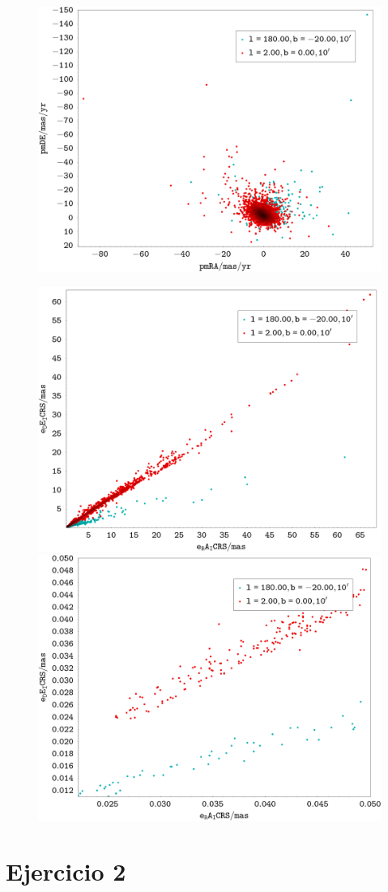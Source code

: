 \documentclass[a4paper,fleqn,usenatbib]{mnras}
\begin{document}
\begin{figure}
  \includegraphics[width=\linewidth]{img/ejercicio1_pmra_pmde}
\end{figure}

\begin{figure}
  \includegraphics[width=0.49\linewidth]{img/ejercicio1_era_ede}
  \includegraphics[width=0.49\linewidth]{img/ejercicio1_era_ede_filtered}
\end{figure}

\section{Ejercicio 2}
\end{document}

